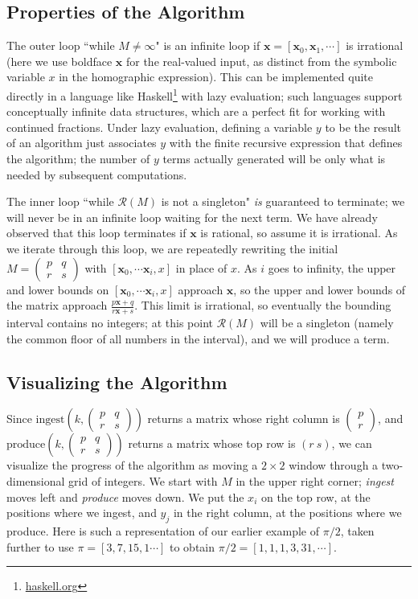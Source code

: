 \documentclass[11pt, oneside]{amsart}   	%
\newcommand{\pqrs}{\left(
\begin{smallmatrix} 
p & q\\ 
r & s 
\end{smallmatrix}
\right)}
\begin{document}
\subsection{Properties of the Algorithm}
The outer loop ``while $M \neq \infty$" is an infinite loop if $\mathbf{x} = [\mathbf{x}_0, \mathbf{x}_1,\cdots]$ is irrational
(here we use boldface $\mathbf{x}$ for the real-valued input, as distinct from the symbolic variable $x$ in the homographic
expression). This can be implemented quite directly in a language like Haskell\footnote{\href{https://haskell.org}{haskell.org}} with
lazy evaluation; such languages support conceptually infinite data structures, which are a perfect fit for working with continued
fractions. Under lazy evaluation, defining a variable $y$ to be the result of an algorithm just associates $y$ with the finite recursive
expression that defines the algorithm; the number of $y$ terms actually generated will be only what is needed by subsequent computations.

The inner loop ``while $\mathcal{R}(M)$ is not a singleton" \emph{is} guaranteed to terminate; we will never be in an infinite loop
waiting for the next term. We have already observed that this loop terminates if $\mathbf{x}$ is rational, so assume it is irrational. As
we iterate through this loop, we are repeatedly rewriting the initial $M = \pqrs$
with $[\mathbf{x}_0, \cdots \mathbf{x}_i, x]$ in place of $x$. As $i$ goes to infinity, the upper and lower bounds on
$[\mathbf{x}_0, \cdots \mathbf{x}_i, x]$ approach $\mathbf{x}$, so the upper and lower bounds of the matrix approach
$\frac{p\mathbf{x}+q}{r\mathbf{x}+s}$.
This limit is irrational, so eventually the bounding interval contains no integers; at this point $\mathcal{R}(M)$  will be a singleton
(namely the common floor of all numbers in the interval), and we will produce a term.


\subsection{Visualizing the Algorithm}
Since $\mbox{ingest}(k,\pqrs)$ returns a matrix whose right column is
$\left( \begin{smallmatrix} p \\  r \end{smallmatrix}\right)$,
and $\mbox{produce}(k,\pqrs)$ returns a matrix whose top row is $(r\ s)$, we can visualize the progress of the algorithm
as moving a $2 \times 2$ window through a two-dimensional grid of integers.
We start with $M$ in the upper right corner; \emph{ingest} moves left and \emph{produce} moves down.
We put the $x_i$ on the top row, at the positions where we ingest, and $y_j$ in the right column, at the positions where we produce.
Here is such a representation of our earlier example of $\pi/2$, taken further to use $\pi = [3,7,15, 1\cdots]$ to obtain $\pi/2 = [1,1,1,3,31,\cdots]$.
\end{document}
